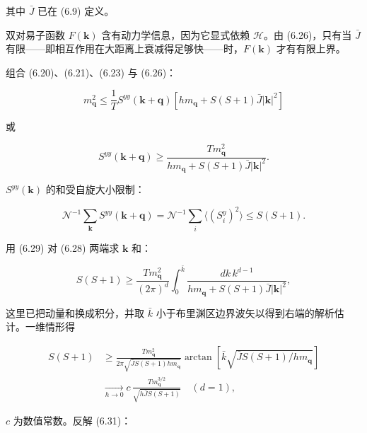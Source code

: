 其中 $\bar{J}$ 已在 (6.9) 定义。

双对易子函数 $F(\mathbf{k})$ 含有动力学信息，因为它显式依赖 $\mathcal{H}$。由 (6.26)，只有当 $\bar{J}$ 有限——即相互作用在大距离上衰减得足够快——时，$F(\mathbf{k})$ 才有有限上界。

组合 (6.20)、(6.21)、(6.23) 与 (6.26)：

\begin{equation*}
m _ {\mathbf {q}} ^ {2} \leq \frac {1}{T} S ^ {yy} ( \mathbf {k} + \mathbf {q} ) \left[ h m _ {\mathbf {q}} + S ( S + 1 ) \bar {J} | \mathbf {k} | ^ {2} \right]
\tag{6.27}
\end{equation*}

或

\begin{equation*}
S ^ {yy} ( \mathbf {k} + \mathbf {q} ) \geq \frac {T m _ {\mathbf {q}} ^ {2}}{h m _ {\mathbf {q}} + S ( S + 1 ) \bar {J} | \mathbf {k} | ^ {2}}.
\tag{6.28}
\end{equation*}

$S^{yy}(\mathbf{k})$ 的和受自旋大小限制：

\begin{equation*}
\mathcal {N} ^ {- 1} \sum_ {\mathbf {k}} S ^ {yy} ( \mathbf {k} + \mathbf {q} ) = \mathcal {N} ^ {- 1} \sum_ {i} \langle \left( S _ {i} ^ {y} \right) ^ {2} \rangle \leq S ( S + 1 ).
\tag{6.29}
\end{equation*}

用 (6.29) 对 (6.28) 两端求 $\mathbf{k}$ 和：

\begin{equation*}
S ( S + 1 ) \geq \frac {T m _ {\mathbf {q}} ^ {2}}{( 2 \pi ) ^ {d}} \int_ {0} ^ {\bar {k}} \frac {d k \, k ^ {d - 1}}{h m _ {\mathbf {q}} + S ( S + 1 ) \bar {J} | \mathbf {k} | ^ {2}} ,
\tag{6.30}
\end{equation*}

这里已把动量和换成积分，并取 $\bar{k}$ 小于布里渊区边界波矢以得到右端的解析估计。一维情形得

\begin{align*}
S ( S + 1 ) & \geq \frac {T m _ {\mathbf {q}} ^ {2}}{2 \pi \sqrt {\bar {J} S ( S + 1 ) h m _ {\mathbf {q}}}} \arctan \left[ \bar {k} \sqrt { \bar {J} S ( S + 1 ) / h m _ {\mathbf {q}} } \right]\\
& \xrightarrow[h \rightarrow 0]{} c \, \frac {T m _ {\mathbf {q}} ^ {3/2}}{\sqrt {h \bar {J} S ( S + 1 )}} \quad ( d = 1 ) ,
\tag{6.31}
\end{align*}

$c$ 为数值常数。反解 (6.31)：

